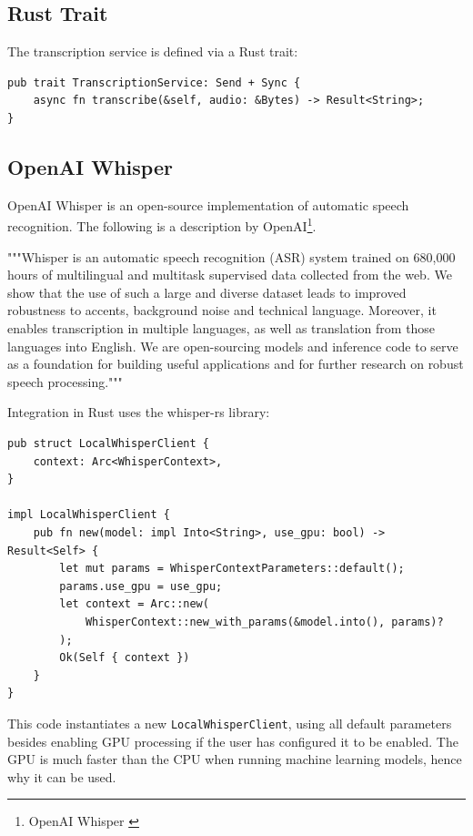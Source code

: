 \subsection{Rust Trait}
The transcription service is defined via a Rust trait:

\begin{verbatim}
pub trait TranscriptionService: Send + Sync {
    async fn transcribe(&self, audio: &Bytes) -> Result<String>;
}
\end{verbatim}

\subsection{OpenAI Whisper}
OpenAI Whisper is an open-source implementation of automatic speech recognition.
The following is a description by OpenAI\footnote{OpenAI Whisper \cite{whisper}}.

"""Whisper is an automatic speech recognition (ASR) system trained on 680,000 hours
of multilingual and multitask supervised data collected from the web.
We show that the use of such a large and diverse dataset leads to improved robustness to accents,
background noise and technical language.
Moreover, it enables transcription in multiple languages,
as well as translation from those languages into English.
We are open-sourcing models and inference code to serve as a foundation for building useful applications
and for further research on robust speech processing."""

Integration in Rust uses the whisper-rs library:

\begin{verbatim}
pub struct LocalWhisperClient {
    context: Arc<WhisperContext>,
}

impl LocalWhisperClient {
    pub fn new(model: impl Into<String>, use_gpu: bool) -> Result<Self> {
        let mut params = WhisperContextParameters::default();
        params.use_gpu = use_gpu;
        let context = Arc::new(
            WhisperContext::new_with_params(&model.into(), params)?
        );
        Ok(Self { context })
    }
}
\end{verbatim}

This code instantiates a new \texttt{LocalWhisperClient}, using all default parameters besides enabling GPU processing
if the user has configured it to be enabled.
The GPU is much faster than the CPU when running machine learning models, hence why it can be used.

